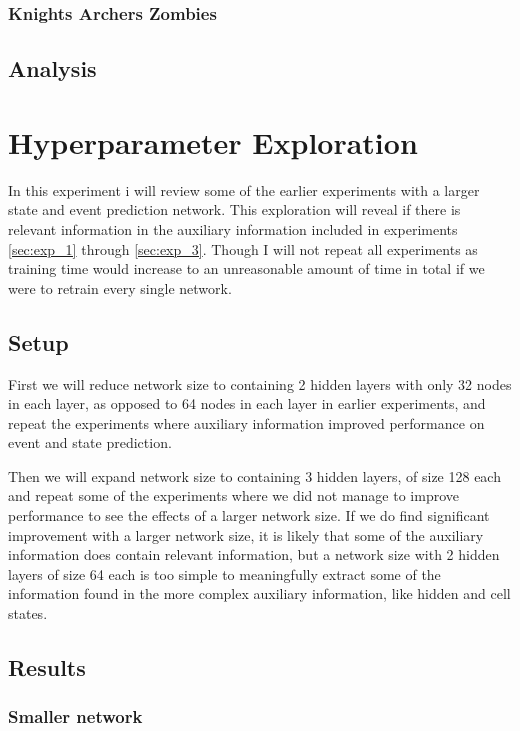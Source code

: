 \documentclass[UKenglish]{uiomasterthesis}
\begin{document}
\subsubsection{Knights Archers Zombies}
\label{sec:kaz_exp3}

\subsection{Analysis}


\section{Hyperparameter Exploration}
\label{sec:exp_4}
In this experiment i will review some of the earlier experiments with a larger state and event prediction network. This exploration will reveal if there is relevant information in the auxiliary information included in experiments \ref{sec:exp_1} through \ref{sec:exp_3}. Though I will not repeat all experiments as training time would increase to an unreasonable amount of time in total if we were to retrain every single network.

\subsection{Setup}
First we will reduce network size to containing 2 hidden layers with only 32 nodes in each layer, as opposed to 64 nodes in each layer in earlier experiments, and repeat the experiments where auxiliary information improved performance on event and state prediction.

Then we will expand network size to containing 3 hidden layers, of size 128 each and repeat some of the experiments where we did not manage to improve performance to see the effects of a larger network size. If we do find significant improvement with a larger network size, it is likely that some of the auxiliary information does contain relevant information, but a network size with 2 hidden layers of size 64 each is too simple to meaningfully extract some of the information found in the more complex auxiliary information, like hidden and cell states.

\subsection{Results}

\subsubsection{Smaller network}
\end{document}
